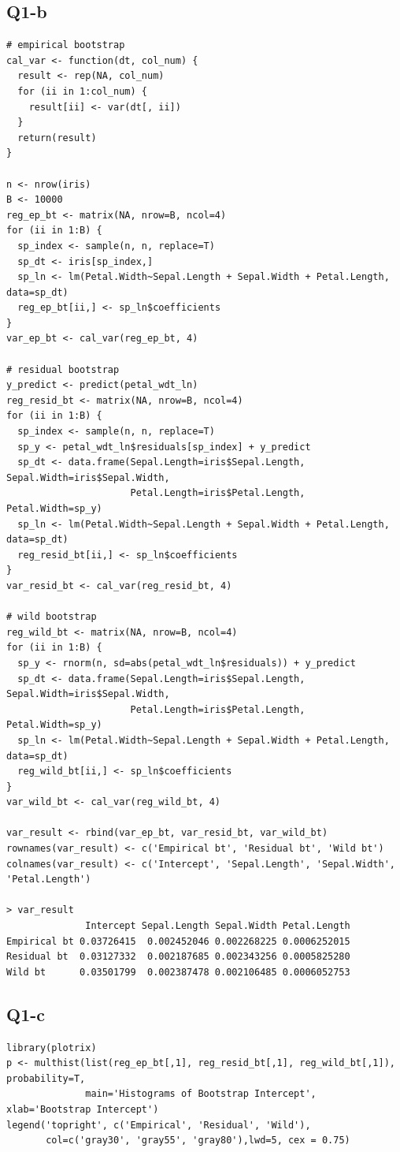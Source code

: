 \documentclass[12pt,letterpaper]{article}
\begin{document}
\subsection*{Q1-b}
\begin{verbatim}
# empirical bootstrap
cal_var <- function(dt, col_num) {
  result <- rep(NA, col_num)
  for (ii in 1:col_num) {
    result[ii] <- var(dt[, ii])
  }
  return(result)
}

n <- nrow(iris)
B <- 10000
reg_ep_bt <- matrix(NA, nrow=B, ncol=4)
for (ii in 1:B) {
  sp_index <- sample(n, n, replace=T)
  sp_dt <- iris[sp_index,]
  sp_ln <- lm(Petal.Width~Sepal.Length + Sepal.Width + Petal.Length, data=sp_dt)
  reg_ep_bt[ii,] <- sp_ln$coefficients 
}
var_ep_bt <- cal_var(reg_ep_bt, 4)

# residual bootstrap
y_predict <- predict(petal_wdt_ln)
reg_resid_bt <- matrix(NA, nrow=B, ncol=4)
for (ii in 1:B) {
  sp_index <- sample(n, n, replace=T)
  sp_y <- petal_wdt_ln$residuals[sp_index] + y_predict
  sp_dt <- data.frame(Sepal.Length=iris$Sepal.Length, Sepal.Width=iris$Sepal.Width, 
                      Petal.Length=iris$Petal.Length, Petal.Width=sp_y)
  sp_ln <- lm(Petal.Width~Sepal.Length + Sepal.Width + Petal.Length, data=sp_dt)
  reg_resid_bt[ii,] <- sp_ln$coefficients
}
var_resid_bt <- cal_var(reg_resid_bt, 4)

# wild bootstrap
reg_wild_bt <- matrix(NA, nrow=B, ncol=4)
for (ii in 1:B) {
  sp_y <- rnorm(n, sd=abs(petal_wdt_ln$residuals)) + y_predict
  sp_dt <- data.frame(Sepal.Length=iris$Sepal.Length, Sepal.Width=iris$Sepal.Width, 
                      Petal.Length=iris$Petal.Length, Petal.Width=sp_y)
  sp_ln <- lm(Petal.Width~Sepal.Length + Sepal.Width + Petal.Length, data=sp_dt)
  reg_wild_bt[ii,] <- sp_ln$coefficients
}
var_wild_bt <- cal_var(reg_wild_bt, 4)

var_result <- rbind(var_ep_bt, var_resid_bt, var_wild_bt)
rownames(var_result) <- c('Empirical bt', 'Residual bt', 'Wild bt')
colnames(var_result) <- c('Intercept', 'Sepal.Length', 'Sepal.Width', 'Petal.Length')

> var_result
              Intercept Sepal.Length Sepal.Width Petal.Length
Empirical bt 0.03726415  0.002452046 0.002268225 0.0006252015
Residual bt  0.03127332  0.002187685 0.002343256 0.0005825280
Wild bt      0.03501799  0.002387478 0.002106485 0.0006052753
\end{verbatim}

\newpage
\subsection*{Q1-c}
\begin{verbatim}
library(plotrix)
p <- multhist(list(reg_ep_bt[,1], reg_resid_bt[,1], reg_wild_bt[,1]), probability=T,
              main='Histograms of Bootstrap Intercept', xlab='Bootstrap Intercept')
legend('topright', c('Empirical', 'Residual', 'Wild'), 
       col=c('gray30', 'gray55', 'gray80'),lwd=5, cex = 0.75)
\end{verbatim}
\end{document}
